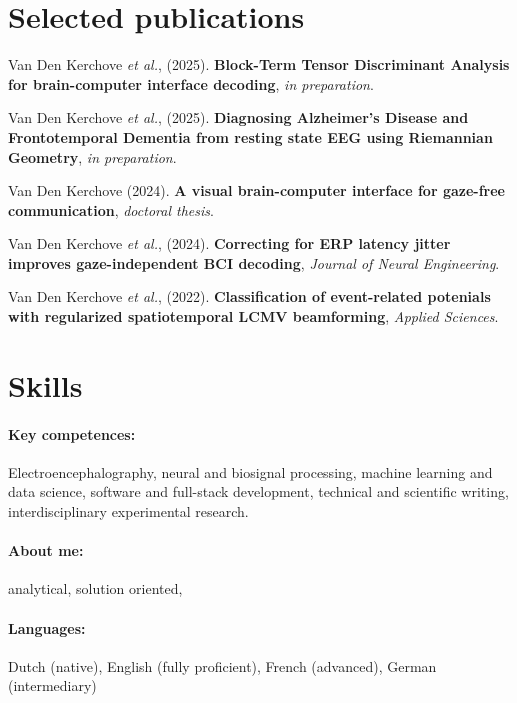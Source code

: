 \documentclass{resume}
\begin{document}
\section{Selected publications}
\begin{description}
  \item Van Den Kerchove \emph{et al.}, (2025). \textbf{Block-Term Tensor Discriminant
  Analysis for brain-computer interface decoding}, \emph{in preparation}.
  \item Van Den Kerchove \emph{et al.}, (2025). \textbf{Diagnosing Alzheimer's Disease
  and Frontotemporal Dementia from resting state EEG using Riemannian
  Geometry}, \emph{in preparation}.
  \item Van Den Kerchove (2024). \textbf{A visual brain-computer interface for gaze-free
  communication}, \emph{doctoral thesis}.
  \item Van Den Kerchove \emph{et al.}, (2024). \textbf{Correcting for ERP latency
  jitter improves gaze-independent BCI decoding}, \emph{Journal of Neural
  Engineering}.
  \item Van Den Kerchove \emph{et al.}, (2022). \textbf{Classification of event-related
  potenials with regularized spatiotemporal LCMV beamforming}, \emph{Applied Sciences}.
\end{description}

\section{Skills}
\paragraph{Key competences:} Electroencephalography, neural and biosignal processing,
machine learning and data science,
software and full-stack development,
technical and scientific writing,
interdisciplinary experimental research.
\paragraph{About me:} analytical, solution oriented,
\paragraph{Languages:} Dutch (native), English (fully proficient), French
(advanced), German (intermediary)
\end{document}
